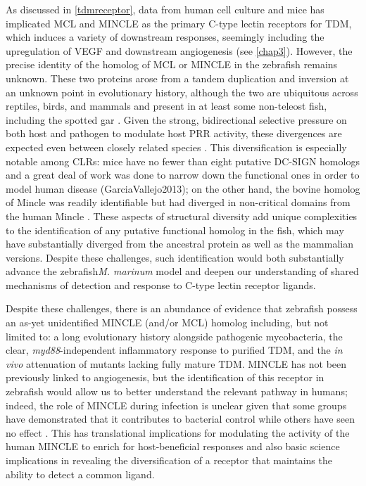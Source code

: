 As discussed in \autoref{tdmreceptor}, data from human cell culture and mice has implicated MCL and MINCLE as the primary C-type lectin receptors for TDM, which induces a variety of downstream responses, seemingly including the upregulation of VEGF and downstream angiogenesis (see \autoref{chap3}). However, the precise identity of the homolog of MCL or MINCLE in the zebrafish remains unknown. These two proteins arose from a tandem duplication and inversion at an unknown point in evolutionary history, although the two are ubiquitous across reptiles, birds, and mammals and present in at least some non-teleost fish, including the spotted gar \citep{Miyake2013, Richardson2014}. Given the strong, bidirectional selective pressure on both host and pathogen to modulate host PRR activity, these divergences are expected even between closely related species \citep{Rambaruth2015}. This diversification is especially notable among CLRs: mice have no fewer than eight putative DC-SIGN homologs and a great deal of work was done to narrow down the functional ones in order to model human disease (GarciaVallejo2013); on the other hand, the bovine homolog of Mincle was readily identifiable but had diverged in non-critical domains from the human Mincle \citep{Feinberg2013, Furukawa2013}. These aspects of structural diversity add unique complexities to the identification of any putative functional homolog in the fish, which may have substantially diverged from the ancestral protein as well as the mammalian versions. Despite these challenges, such identification would both substantially advance the zebrafish\textit{M. marinum} model and deepen our understanding of shared mechanisms of detection and response to C-type lectin receptor ligands.

Despite these challenges, there is an abundance of evidence that zebrafish possess an as-yet unidentified MINCLE (and/or MCL) homolog including, but not limited to: a long evolutionary history alongside pathogenic mycobacteria, the clear, \textit{myd88}-independent inflammatory response to purified TDM, and the \textit{in vivo} attenuation of mutants lacking fully mature TDM. MINCLE has not been previously linked to angiogenesis, but the identification of this receptor in zebrafish would allow us to better understand the relevant pathway in humans; indeed, the role of MINCLE during infection is unclear given that some groups have demonstrated that it contributes to bacterial control while others have seen no effect \citep{Behler2012, Behler2015, Heitmann2013, Lee2012}. This has translational implications for modulating the activity of the human MINCLE to enrich for host-beneficial responses and also basic science implications in revealing the diversification of a receptor that maintains the ability to detect a common ligand. 

